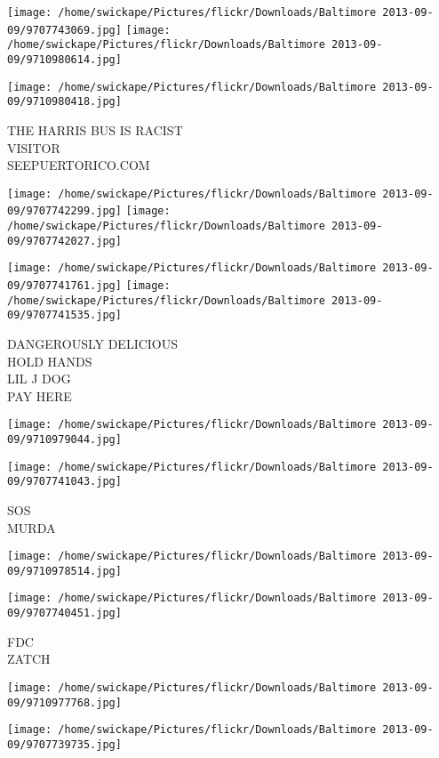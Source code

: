 \documentclass[10pt,letterpaper]{article}
\begin{document}
\texttt{[image: /home/swickape/Pictures/flickr/Downloads/Baltimore 2013-09-09/9707743069.jpg]}
\texttt{[image: /home/swickape/Pictures/flickr/Downloads/Baltimore 2013-09-09/9710980614.jpg]}

\vspace{0.25in}
\texttt{[image: /home/swickape/Pictures/flickr/Downloads/Baltimore 2013-09-09/9710980418.jpg]}

THE HARRIS BUS IS RACIST\\
VISITOR\\
SEEPUERTORICO.COM
\pagebreak

\texttt{[image: /home/swickape/Pictures/flickr/Downloads/Baltimore 2013-09-09/9707742299.jpg]}
\texttt{[image: /home/swickape/Pictures/flickr/Downloads/Baltimore 2013-09-09/9707742027.jpg]}

\texttt{[image: /home/swickape/Pictures/flickr/Downloads/Baltimore 2013-09-09/9707741761.jpg]}
\texttt{[image: /home/swickape/Pictures/flickr/Downloads/Baltimore 2013-09-09/9707741535.jpg]}

DANGEROUSLY DELICIOUS\\
HOLD HANDS\\
LIL J DOG\\
PAY HERE
\pagebreak

\texttt{[image: /home/swickape/Pictures/flickr/Downloads/Baltimore 2013-09-09/9710979044.jpg]}

\vspace{0.25in}
\texttt{[image: /home/swickape/Pictures/flickr/Downloads/Baltimore 2013-09-09/9707741043.jpg]}

SOS\\
MURDA
\pagebreak

\texttt{[image: /home/swickape/Pictures/flickr/Downloads/Baltimore 2013-09-09/9710978514.jpg]}

\vspace{0.25in}
\texttt{[image: /home/swickape/Pictures/flickr/Downloads/Baltimore 2013-09-09/9707740451.jpg]}

FDC\\
ZATCH
\pagebreak

\texttt{[image: /home/swickape/Pictures/flickr/Downloads/Baltimore 2013-09-09/9710977768.jpg]}

\vspace{0.25in}
\texttt{[image: /home/swickape/Pictures/flickr/Downloads/Baltimore 2013-09-09/9707739735.jpg]}
\end{document}
